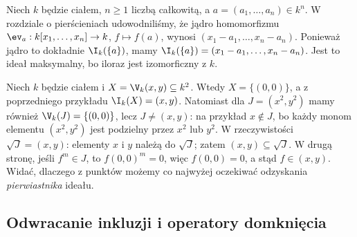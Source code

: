 \begin{przyklad}
Niech $k$ będzie ciałem, $n\ge1$ liczbą całkowitą,
a $a=(a_1,\dots,a_n)\in k^n$. W rozdziale o pierścieniach
udowodniliśmy, że jądro homomorfizmu
$\ev_a:k[x_1,\dots,x_n]\to k$, $f\mapsto f(a)$,
wynosi $(x_1-a_1,\dots,x_n-a_n)$.
Ponieważ jądro to dokładnie $\I_k(\{a\})$, mamy
$\I_k(\{a\})=(x_1-a_1,\dots,x_n-a_n)$.
Jest to ideał maksymalny, bo iloraz jest izomorficzny z $k$.
\end{przyklad}

\begin{przyklad}
Niech $k$ będzie ciałem i $X=\V_k(x,y)\subseteq k^2$. Wtedy $X=\{(0,0)\}$,
a z poprzedniego przykładu $\I_k(X)=(x,y)$.
Natomiast dla $J=(x^2,y^2)$ mamy również
$\V_k(J)=\{(0,0)\}$, lecz $J\ne(x,y)$:
na przykład $x\notin J$, bo każdy monom elementu
$(x^2,y^2)$ jest podzielny przez $x^2$ lub $y^2$.
W rzeczywistości $\sqrt J=(x,y)$: elementy $x$ i $y$
należą do $\sqrt J$; zatem $(x,y)\subseteq\sqrt J$.
W drugą stronę, jeśli $f^m\in J$, to $f(0,0)^m=0$,
więc $f(0,0)=0$, a stąd $f\in(x,y)$.
Widać, dlaczego z punktów możemy co najwyżej oczekiwać
odzyskania \emph{pierwiastnika} ideału.
\end{przyklad}

\subsection{Odwracanie inkluzji i operatory domknięcia}

